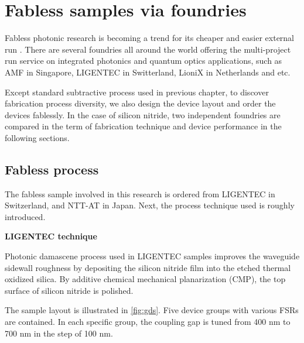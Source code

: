 
\chapter{Fabless samples via foundries}\label{chap:6}

Fabless photonic research is becoming a trend for its cheaper and easier external run \cite{Hochberg2010}. There are several foundries all around the world offering the multi-project run service on integrated photonics and quantum optics applications, such as AMF in Singapore, LIGENTEC in Switterland, LioniX in Netherlands and etc. 

Except standard subtractive process used in previous chapter, to discover fabrication process diversity, we also design the device layout and order the devices fablessly.
In the case of silicon nitride, two independent foundries are compared in the term of fabrication technique and device performance in the following sections.

\section{Fabless process}
The fabless sample involved in this research is ordered from LIGENTEC in Switzerland, and NTT-AT in Japan. Next, the process technique used is roughly introduced.

\bigskip
\noindent\textbf{LIGENTEC technique}

Photonic damascene process \cite{Pfeiffer2015a,Pfeiffer2018a} used in LIGENTEC samples improves the waveguide sidewall roughness by depositing the silicon nitride film into the etched thermal oxidized silica. By additive chemical mechanical planarization (CMP), the top surface of silicon nitride is polished.

The sample layout is illustrated in \autoref{fig:gds}. Five device groups with various FSRs are contained. In each specific group, the coupling gap is tuned from 400 nm to 700 nm in the step of 100 nm.


